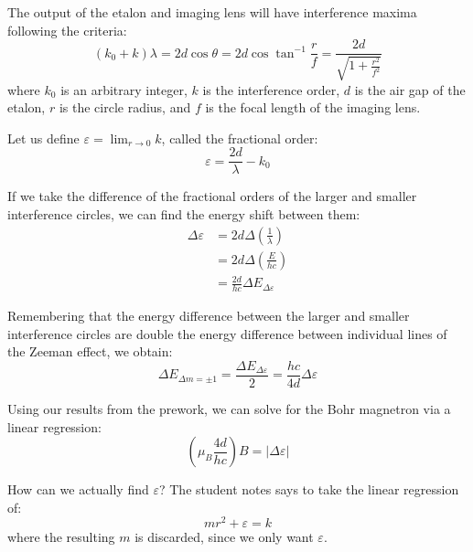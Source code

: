 \documentclass[a4paper]{scrartcl}
\begin{document}
The output of the etalon and imaging lens will have interference maxima following the criteria:
\[(k_0 + k) \lambda = 2 d \cos \theta = 2 d \cos \tan^{-1} \frac{r}{f} = \frac{2 d}{\sqrt{1 + \frac{r^2}{f^2}}}\]
where \(k_0\) is an arbitrary integer, \(k\) is the interference order, \(d\) is the air gap of the etalon, \(r\) is the circle radius, and \(f\) is the focal length of the imaging lens.

Let us define \(\varepsilon = \lim_{r \to 0} k\), called the fractional order:
\[\varepsilon = \frac{2 d}{\lambda} - k_0\]

If we take the difference of the fractional orders of the larger and smaller interference circles, we can find the energy shift between them:
\begin{align*}
    \Delta \varepsilon &= 2 d \Delta\left(\frac{1}{\lambda}\right) \\
    &= 2 d \Delta\left(\frac{E}{h c}\right) \\
    &= \frac{2 d}{h c} \Delta E_{\Delta \varepsilon}
\end{align*}

Remembering that the energy difference between the larger and smaller interference circles are double the energy difference between individual lines of the Zeeman effect, we obtain:
\[\Delta E_{\Delta m = \pm 1} = \frac{\Delta E_{\Delta \varepsilon}}{2} = \frac{h c}{4 d} \Delta \varepsilon\]

Using our results from the prework, we can solve for the Bohr magnetron via a linear regression:
\[\left(\mu_B \frac{4 d}{h c}\right) B = \left|\Delta \varepsilon\right|\]

How can we actually find \(\varepsilon\)? The student notes says to take the linear regression of:
\[m r^2 + \varepsilon = k\]
where the resulting \(m\) is discarded, since we only want \(\varepsilon\).
\end{document}
